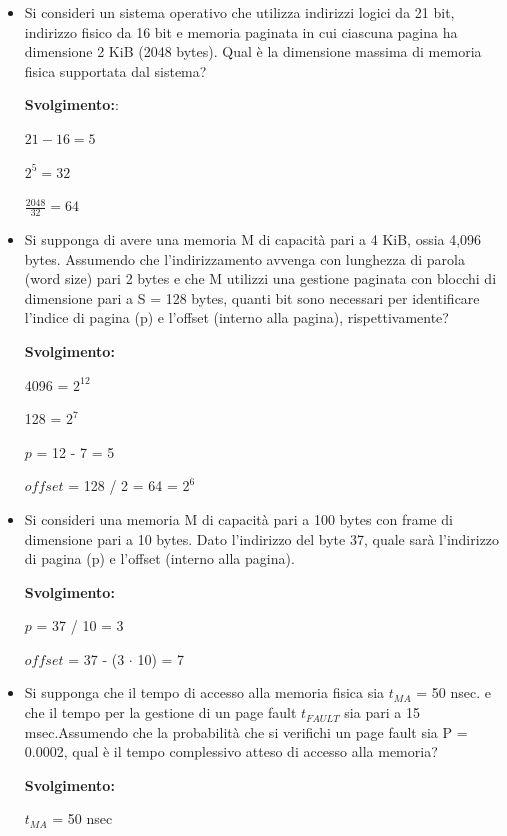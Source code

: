 \documentclass{article}
\begin{document}
\begin{itemize}
    \item Si consideri un sistema operativo che utilizza indirizzi logici da 21 bit, indirizzo fisico da 16 bit e memoria paginata in cui ciascuna pagina ha dimensione 2 KiB (2048 bytes). Qual è la dimensione massima di memoria fisica supportata dal sistema?\par
    \textbf{Svolgimento:}:\par
    \begin{center}
        $21-16 = 5$ \par
        $2^{5} = 32$\par
        $\frac{2048}{32} = 64$\par
    \end{center}

    \item Si supponga di avere una memoria M di capacità pari a 4 KiB, ossia 4,096 bytes. Assumendo che l'indirizzamento avvenga con lunghezza di parola (word size) pari 2 bytes e che M utilizzi una gestione paginata con blocchi di dimensione pari a S = 128 bytes, quanti bit sono necessari per identificare l'indice di pagina (p) e l'offset (interno alla pagina), rispettivamente?\par
    \textbf{Svolgimento:}\par
    4096 = $2^{12}$\par
    128 = $2^{7}$\par
    $p$ = 12 - 7 = 5\par
    $offset$ = 128 / 2 = 64 = $2^{6}$\par
    \item Si consideri una memoria M di capacità pari a 100 bytes con frame di dimensione pari a 10 bytes. Dato l'indirizzo del byte 37, quale sarà l'indirizzo di pagina (p) e l'offset (interno alla pagina).\par
    \textbf{Svolgimento:}\par
    $p$ = 37 / 10 = 3\par
    $offset$ = 37 - (3 $\cdot$ 10) = 7\par
    \item Si supponga che il tempo di accesso alla memoria fisica sia $t_{MA}$ = 50 nsec. e che il tempo per la gestione di un page fault $t_{FAULT}$ sia pari a 15 msec.Assumendo che la probabilità che si verifichi un page fault sia P = 0.0002, qual è il tempo complessivo atteso di accesso alla memoria?\par
    \textbf{Svolgimento:}\par
    $t_{MA}$ = 50 nsec\par

\end{itemize}
\end{document}
